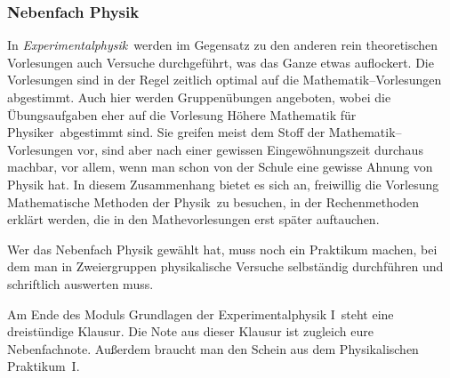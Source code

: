 \subsubsection{Nebenfach Physik}

In \textit{\glqq Experimentalphysik\grqq}\ werden im Gegensatz
zu den anderen rein theoretischen Vorlesungen
auch Versuche durchgeführt, was das Ganze etwas auflockert.
Die Vorlesungen sind in der Regel
zeitlich optimal auf die Mathematik--Vorlesungen abgestimmt.
Auch hier werden Gruppenübungen angeboten,
wobei die Übungsaufgaben eher auf die Vorlesung
\glqq Höhere Mathematik für Physiker\grqq\ abgestimmt sind.
Sie greifen meist dem Stoff der Mathematik--Vorlesungen vor, 
sind aber nach einer gewissen Eingewöhnungszeit durchaus machbar,
vor allem, wenn man schon von der Schule
eine gewisse Ahnung von Physik hat.
In diesem Zusammenhang bietet es sich an,
freiwillig die Vorlesung
\glqq Mathematische Methoden der Physik\grqq\ zu besuchen,
in der Rechenmethoden erklärt werden,
die in den Mathevorlesungen erst später auftauchen. 

Wer das Nebenfach Physik gewählt hat,
muss noch ein Praktikum machen,
bei dem man in Zweiergruppen physikalische Versuche
selbständig durchführen und schriftlich auswerten muss.


\begin{center}
\end{center}
Am Ende des Moduls \glqq Grundlagen der Experimentalphysik I\grqq\ 
steht eine dreistündige Klausur.
Die Note aus dieser Klausur ist zugleich eure Nebenfachnote.
Außerdem braucht man den Schein aus dem \glqq Physikalischen Praktikum~I\grqq.

